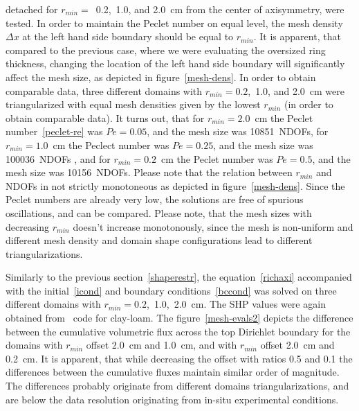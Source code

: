 \documentclass[review,times,3p,10pt]{elsarticle}
\begin{document}
{{detached for $r_{min}=$~0.2,~1.0, and 2.0~cm from the center of axisymmetry, were tested. In order to maintain the Peclet number on equal level, the mesh density
 $\Delta x$ at the left hand side boundary should be equal to $r_{min}$. It is apparent, that compared to the previous case, where we were evaluating the oversized ring thickness, changing the location of the left hand side boundary will significantly affect the mesh size, as depicted in figure~\ref{mesh-dens}. In order to obtain comparable data,  three different domains with $r_{min}=0.2$,~1.0, and 2.0~cm  were triangularized with equal mesh densities given by the lowest $r_{min}$  (in order to obtain comparable data). It turns out, that for $r_{min}=2.0$~cm the Peclet number~\eqref{peclet-re} was $Pe=0.05$, and the mesh size was 10851~NDOFs, for $r_{min}=1.0$~cm the Peclect number was $Pe=0.25$, and the mesh size was 100036~NDOFs , and for $r_{min}=0.2$~cm the Peclet number was $Pe=0.5$, and the mesh size was 10156~NDOFs. Please note that the relation between $r_{min}$ and NDOFs in not strictly monotoneous as depicted in figure~\ref{mesh-dens}. Since the Peclet numbers are already very low, the solutions are free of spurious oscillations, and can be compared. Please note, that the mesh sizes with decreasing $r_{min}$ doesn't increase monotonously, since the mesh is non-uniform and different mesh density and domain shape configurations lead to different triangularizations.
 
 Similarly to the previous section~\ref{shaperestr}, the equation~\eqref{richaxi} accompanied with the initial~\eqref{icond} and boundary conditions~\eqref{bccond} was solved on three different domains with $r_{min}=0.2$,~1.0,~2.0~cm. The SHP values were again obtained from~\citep{retc} code for clay-loam. The figure~\ref{mesh-evals2} depicts the difference between the cumulative volumetric flux across  the top Dirichlet boundary for the domains with $r_{min}$ offset 2.0~cm and 1.0~cm, and with $r_{min}$ offset 2.0~cm and 0.2~cm. It is apparent, that while decreasing the offset with ratios 0.5 and 0.1 the differences between the cumulative fluxes maintain similar order of magnitude. The differences probably originate from different domains triangularizations, and are below the data resolution originating from in-situ experimental conditions. 
 
 }



}
\end{document}
